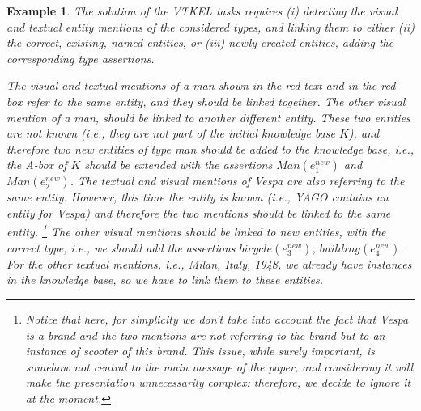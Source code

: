 \documentclass[11pt,a4paper]{article}
\newtheorem{example}{Example}[section]
\begin{document}
\begin{example}
	The solution of the VTKEL tasks requires (i) detecting the visual and
	textual entity mentions of the considered types, and linking them to
	either (ii) the correct, existing, named entities, or (iii) newly
	created entities, adding the corresponding type assertions.
	
	The visual and textual mentions of a man shown in the red text and in
	the red box refer 
	to the same entity, and they should be linked together. The other visual
	mention of a man, should be linked to another different entity. These two
	entities are not known (i.e., they are not part of the initial
	knowledge base $K$), and therefore two new entities of type man
	should be added to the knowledge base, i.e., the A-box of $K$ should
	be extended with the assertions $Man(e^{new}_1)$ and $Man(e^{new}_2)$.
	The textual and visual mentions of Vespa are also referring to the same
	entity. However, this time the entity is known (i.e., YAGO contains an
	entity for Vespa) and  therefore the two mentions should be linked
	to the same entity.%
	\footnote{Notice that here, for simplicity we don't take into account
		the fact that Vespa is a brand and the two mentions are not
		referring to the brand but to an instance of scooter of this
		brand. This issue, while surely important, is somehow not central to the
		main message of the paper, and considering it will make the
		presentation unnecessarily complex: therefore, we decide to ignore
		it at the moment.}
	The other visual mentions should be linked to new entities, with the
	correct type, i.e., we should add the assertions $bicycle(e^{new}_3)$,
	$building(e^{new}_4)$. For the other textual mentions, i.e., {\it Milan},
	{\it Italy}, {\it 1948},  we already have instances in the knowledge base, so we
	have to link them to these entities. 
\end{example}
\end{document}
